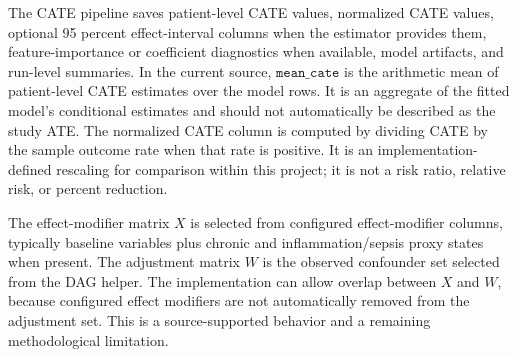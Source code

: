 The CATE pipeline saves patient-level CATE values, normalized CATE values, optional 95 percent effect-interval columns when the estimator provides them, feature-importance or coefficient diagnostics when available, model artifacts, and run-level summaries.  In the current source, \(\texttt{mean\_cate}\) is the arithmetic mean of patient-level CATE estimates over the model rows.  It is an aggregate of the fitted model's conditional estimates and should not automatically be described as the study ATE.  The normalized CATE column is computed by dividing CATE by the sample outcome rate when that rate is positive.  It is an implementation-defined rescaling for comparison within this project; it is not a risk ratio, relative risk, or percent reduction.

The effect-modifier matrix \(X\) is selected from configured effect-modifier columns, typically baseline variables plus chronic and inflammation/sepsis proxy states when present.  The adjustment matrix \(W\) is the observed confounder set selected from the DAG helper.  The implementation can allow overlap between \(X\) and \(W\), because configured effect modifiers are not automatically removed from the adjustment set.  This is a source-supported behavior and a remaining methodological limitation.

